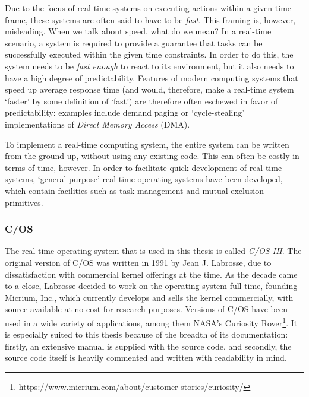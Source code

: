 \documentclass[twoside]{uva-inf-bachelor-thesis}
\newcommand{\ucosiii}{\textmu C/OS-III\xspace}
\newcommand{\ucos}{\textmu C/OS\xspace}
\begin{document}
Due to the focus of real-time systems on executing actions within a given time frame, these systems are often said to have to be \textit{fast}. This framing is, however, misleading. When we talk about speed, what do we mean? In a real-time scenario, a system is required to provide a guarantee that tasks can be successfully executed within the given time constraints. In order to do this, the system needs to be \textit{fast enough} to react to its environment, but it also needs to have a high degree of predictability. Features of modern computing systems that speed up average response time (and would, therefore, make a real-time system `faster' by some definition of `fast') are therefore often eschewed in favor of predictability: examples include demand paging or `cycle-stealing' implementations of \textit{Direct Memory Access} (DMA).

To implement a real-time computing system, the entire system can be written from the ground up, without using any existing code. This can often be costly in terms of time, however. In order to facilitate quick development of real-time systems, `general-purpose' real-time operating systems have been developed, which contain facilities such as task management and mutual exclusion primitives.

\subsubsection{\ucos} \label{sec:ucos}
The real-time operating system that is used in this thesis is called \textit{\ucosiii}. The original version of \ucos was written in 1991 by Jean J. Labrosse, due to dissatisfaction with commercial kernel offerings at the time. As the decade came to a close, Labrosse decided to work on the operating system full-time, founding Micrium, Inc., which currently develops and sells the kernel commercially, with source available at no cost for research purposes. Versions of \ucos have been used in a wide variety of applications, among them NASA's Curiosity Rover\footnote{https://www.micrium.com/about/customer-stories/curiosity/}. It is especially suited to this thesis because of the breadth of its documentation: firstly, an extensive manual \cite{micrium:ucosmanual} is supplied with the source code, and secondly, the source code itself is heavily commented and written with readability in mind.
\end{document}
